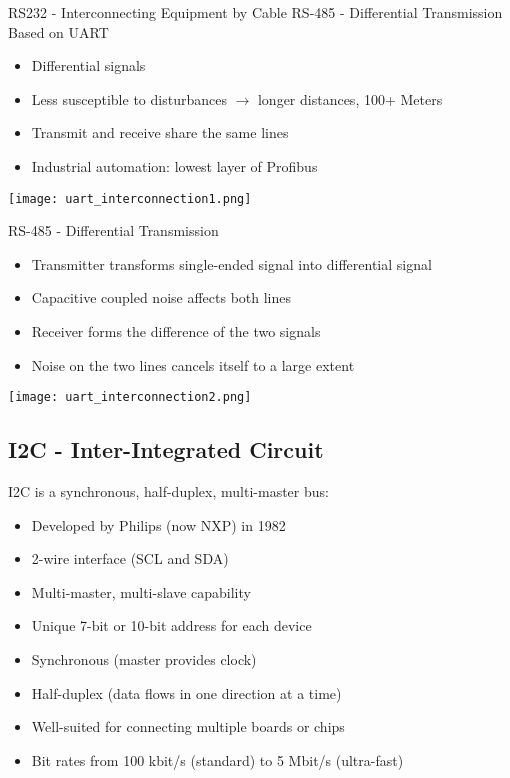 \begin{concept}{RS232 - Interconnecting Equipment by Cable}
    RS-485 - Differential Transmission Based on UART
    \begin{itemize}
        \item Differential signals 
        \item Less susceptible to disturbances $\rightarrow$ longer distances, 100+ Meters
        \item Transmit and receive share the same lines
        \item Industrial automation: lowest layer of Profibus
    \end{itemize}
    \texttt{[image: uart\_interconnection1.png]}
\end{concept}

\begin{theorem}
    {RS-485 - Differential Transmission}
    \begin{itemize}
        \item Transmitter transforms single-ended signal into differential signal
        \item Capacitive coupled noise affects both lines
        \item Receiver forms the difference of the two signals
        \item Noise on the two lines cancels itself to a large extent
    \end{itemize}
    \texttt{[image: uart\_interconnection2.png]}
\end{theorem}


\raggedcolumns
\pagebreak






\subsection{I2C - Inter-Integrated Circuit}



\begin{definition}{I2C} is a synchronous, half-duplex, multi-master bus:
\begin{itemize}
    \item Developed by Philips (now NXP) in 1982
    \item 2-wire interface (SCL and SDA)
    \item Multi-master, multi-slave capability
    \item Unique 7-bit or 10-bit address for each device
    \item Synchronous (master provides clock)
    \item Half-duplex (data flows in one direction at a time)
    \item Well-suited for connecting multiple boards or chips
    \item Bit rates from 100 kbit/s (standard) to 5 Mbit/s (ultra-fast)
\end{itemize}
\end{definition}

